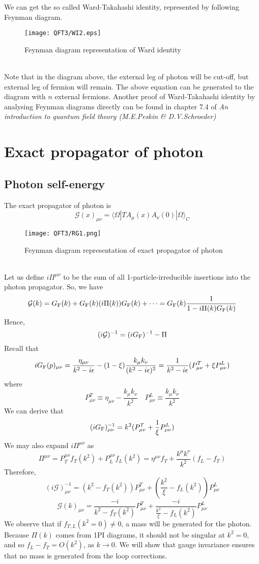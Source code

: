 We can get the so called Ward-Takahashi identity, represented by following Feynman diagram.
\begin{figure}[!h]
\centering
\texttt{[image: QFT3/WI2.eps]}
\caption{Feynman diagram representation of Ward identity}
\end{figure}
\\
Note that in the diagram above, the external leg of photon will be cut-off, but external leg of fermion will remain.
The above equation can be generated to the diagram with $n$ external fermions. 
Another proof of Ward-Takahashi identity by analysing Feynman diagrams directly can be found in chapter 7.4 of \emph{An introduction to quantum field theory (M.E.Peskin \& D.V.Schroeder)}

\section{Exact propagator of photon}
\subsection{Photon self-energy}
\noindent
The exact propagator of photon is
\[\mathcal{G}(x)_{\mu\nu} = \langle  \Omega | T A_{\mu}(x)A_{\nu}(0)| \Omega \rangle_C\]
\begin{figure}[!htb]
\centering
\texttt{[image: QFT3/RG1.png]}
\caption{Feynman diagram representation of exact propagator of photon}
\end{figure}
\\
Let us define $i\Pi^{\mu\nu}$ to be the sum of all 1-particle-irreducible insertions into the photon propagator.
So, we have
\[\mathcal{G}(k) = G_{\rm F}(k) + G_{\rm F}(k)(i\Pi(k))G_{\rm F}(k) + \cdots = G_{\rm F}(k) \frac{1}{1-i\Pi(k)G_{\rm F}(k)}\]
Hence,
\[(i\mathcal{G})^{-1} = (iG_{\rm F})^{-1} - \Pi\]
Recall that
\[iG_{\rm F}(p)_{\mu\nu}  = \frac{\eta_{\mu\nu}}{k^2-i\epsilon} - (1-\xi)\frac{k_{\mu}k_{\nu}}{(k^2-i\epsilon)^2} = \frac{1}{k^2-i\epsilon}(P^T_{\mu\nu} + \xi P^L_{\mu\nu})\]
where 
\[P^T_{\mu\nu} \equiv \eta_{\mu\nu} - \frac{k_{\mu}k_{\nu}}{k^2} \quad  P^L_{\mu\nu} \equiv \frac{k_{\mu}k_{\nu}}{k^2}\]
We can derive that
\[(iG_{\rm F})^{-1}_{\mu\nu} = k^2 (P^T_{\mu\nu} + \frac{1}{\xi} P^L_{\mu\nu})\]
We may also expand $i\Pi^{\mu\nu}$ as
\[\Pi^{\mu\nu} = P_T^{\mu\nu}f_T(k^2) +  P_L^{\mu\nu}f_L(k^2) = \eta^{\mu\nu}f_T + \frac{k^{\mu}k^{\nu}}{k^2}(f_L-f_T)\]
Therefore,
\[(i\mathcal{G})^{-1}_{\mu\nu} = (k^2-f_T(k^2))P^T_{\mu\nu} + (\frac{k^2}{\xi}-f_L(k^2)) P^L_{\mu\nu}\]
\[\mathcal{G}(k)_{\mu\nu} = \frac{-i}{k^2-f_T(k^2)}P^T_{\mu\nu} + \frac{-i}{\frac{k^2}{\xi}-f_L(k^2)} P^L_{\mu\nu}\]
We observe that if $f_{T,L}(k^2 = 0) \neq 0$, a mass will be generated for the photon. Because $\Pi(k)$ comes from 1PI diagrams, it should not be singular at $k^2 =0 $, and so $f_L - f_T = O(k^2)$, as $k \to 0$. We will show that gauge invariance ensures that no mass is generated from the loop corrections.


